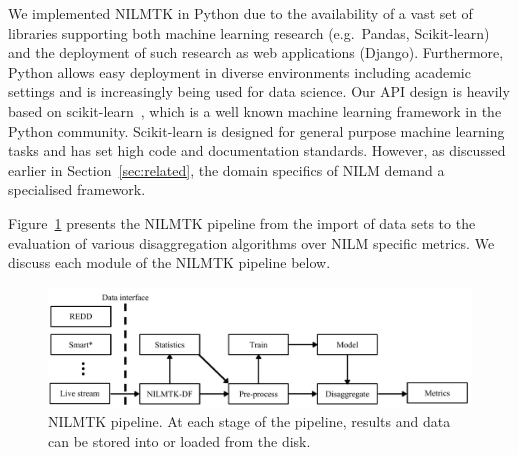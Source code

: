 \documentclass{sig-alternate}
\newcommand{\bluecolor}[1]{\textcolor{blue}{#1}}
\newcommand{\figref}[1]{Figure~\ref{#1}}
\newcommand{\secref}[1]{Section~\ref{#1}}
\begin{document}

We implemented NILMTK in Python due to the availability of a vast set of libraries supporting both machine learning research (e.g.\ Pandas, Scikit-learn) and the deployment of such research as web applications (Django). Furthermore, Python allows easy deployment in diverse environments including academic settings and is increasingly being used for data science.
Our API design is heavily based on scikit-learn~\cite{scikit, scikit_api}, which is a well known machine learning framework in the Python community. Scikit-learn is designed for general purpose machine learning tasks and has set high code and documentation standards. However, as discussed earlier in \secref{sec:related}, the domain specifics of NILM demand a specialised framework. 

\figref{fig:pipeline} presents the NILMTK pipeline from the import of data sets to the evaluation of various disaggregation algorithms over NILM specific metrics. We discuss each module of the NILMTK pipeline below.

\begin{figure}
\centering \includegraphics[scale=0.7]{figures/pipeline.pdf}
\caption{NILMTK pipeline. At each stage of the pipeline, results and data can be stored into or loaded from the disk.}
\label{fig:pipeline}
\end{figure}
\end{document}
